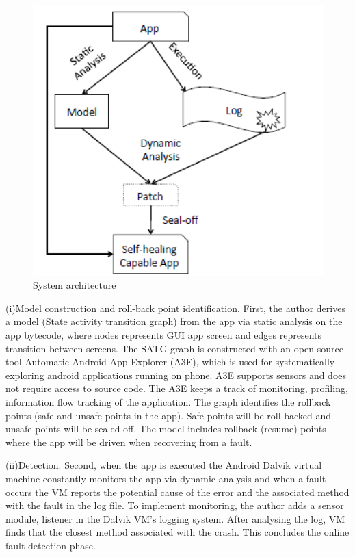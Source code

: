 \begin{compactitem}
\begin{figure}[H]
\center
\includegraphics[width=5in]{img/smartphone_2014}
\caption{System architecture}
\end{figure}

(i)Model construction and roll-back point identification. First, the author derives a model (State activity transition graph) from the app via static analysis on the app bytecode, where nodes represents GUI app screen and edges represents transition between screens. The SATG graph is constructed with an open-source tool Automatic Android App Explorer (A3E), which is used for systematically exploring android applications running on phone. A3E supports sensors and does not require access to source code. The A3E keeps a track of monitoring, profiling, information flow tracking of the application. The graph identifies the rollback points (safe and unsafe points in the app). Safe points will be roll-backed and unsafe points will be sealed off. The model includes rollback (resume) points where the app will be driven when recovering from a fault.

(ii)Detection. Second, when the app is executed the Android Dalvik virtual machine constantly monitors the app via dynamic analysis and when a fault occurs the VM reports the potential cause of the error and the associated method with the fault in the log file. To implement monitoring, the author adds a sensor module, listener in the Dalvik VM's logging system. After analysing the log, VM finds that the closest method associated with the crash. This concludes the online fault detection phase. 


\end{compactitem}
